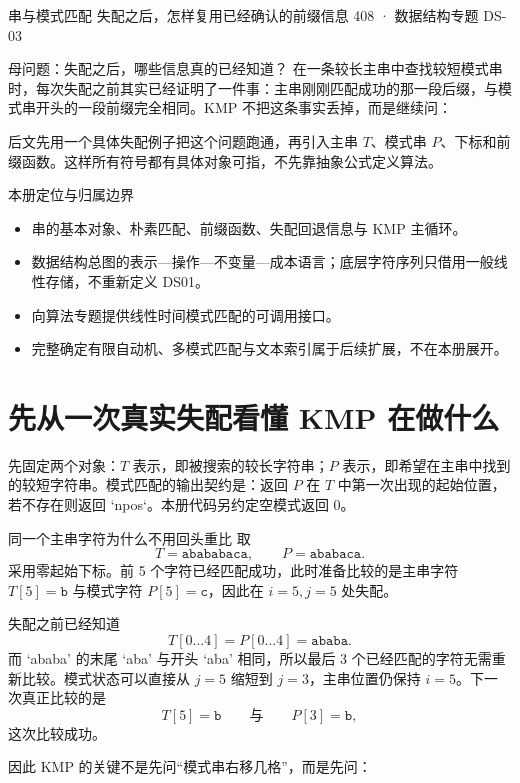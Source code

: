 \documentclass[UTF8,fontset=none,11pt,a4paper]{ctexart}
\begin{document}
\handbooktitle
  {串与模式匹配}
  {失配之后，怎样复用已经确认的前缀信息}
  {408 · 数据结构专题 DS-03}

\begin{corebox}{母问题：失配之后，哪些信息真的已经知道？}
在一条较长主串中查找较短模式串时，每次失配之前其实已经证明了一件事：主串刚刚匹配成功的那一段后缀，与模式串开头的一段前缀完全相同。KMP 不把这条事实丢掉，而是继续问：

后文先用一个具体失配例子把这个问题跑通，再引入主串 $T$、模式串 $P$、下标和前缀函数。这样所有符号都有具体对象可指，不先靠抽象公式定义算法。
\end{corebox}

\begin{methodbox}{本册定位与归属边界}
\begin{itemize}
\item {}串的基本对象、朴素匹配、前缀函数、失配回退信息与 KMP 主循环。
\item {}数据结构总图的表示—操作—不变量—成本语言；底层字符序列只借用一般线性存储，不重新定义 DS01。
\item {}向算法专题提供线性时间模式匹配的可调用接口。
\item {}完整确定有限自动机、多模式匹配与文本索引属于后续扩展，不在本册展开。
\end{itemize}
\end{methodbox}

\tableofcontents\newpage

\section{先从一次真实失配看懂 KMP 在做什么}
先固定两个对象：$T$ 表示，即被搜索的较长字符串；$P$ 表示，即希望在主串中找到的较短字符串。模式匹配的输出契约是：返回 $P$ 在 $T$ 中第一次出现的起始位置，若不存在则返回 `npos`。本册代码另约定空模式返回 0。

\begin{examplebox}{同一个主串字符为什么不用回头重比}
取
\[
T=\texttt{abababaca},\qquad P=\texttt{ababaca}.
\]
采用零起始下标。前 5 个字符已经匹配成功，此时准备比较的是主串字符 $T[5]=\texttt{b}$ 与模式字符 $P[5]=\texttt{c}$，因此在 $i=5,j=5$ 处失配。

失配之前已经知道
\[
T[0\ldots4]=P[0\ldots4]=\texttt{ababa}.
\]
而 `ababa' 的末尾 `aba' 与开头 `aba' 相同，所以最后 3 个已经匹配的字符无需重新比较。模式状态可以直接从 $j=5$ 缩短到 $j=3$，主串位置仍保持 $i=5$。下一次真正比较的是
\[
T[5]=\texttt{b}\qquad\text{与}\qquad P[3]=\texttt{b},
\]
这次比较成功。

因此 KMP 的关键不是先问“模式串右移几格”，而是先问：
\end{examplebox}
\end{document}
